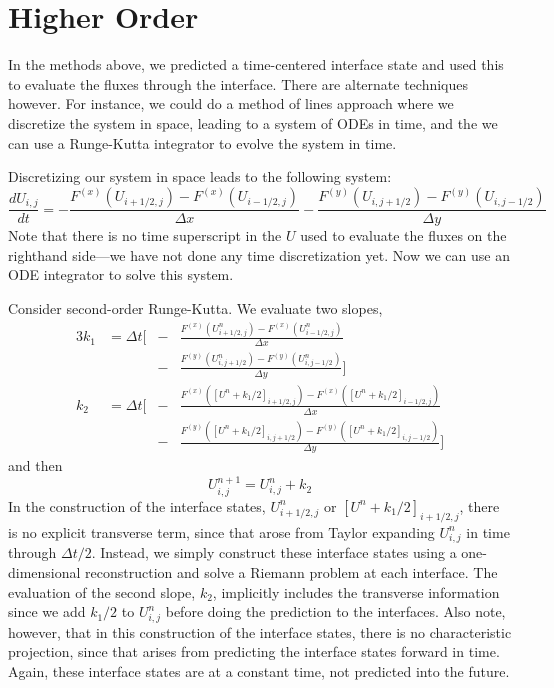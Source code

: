 \section{Higher Order}

In the methods above, we predicted a time-centered interface state and
used this to evaluate the fluxes through the interface.  There are
alternate techniques however.  For instance, we could do a method of
lines approach where we discretize the system in space, leading to a
system of ODEs in time, and the we can use a Runge-Kutta integrator to
evolve the system in time.

Discretizing our system in space leads to the following system:
\begin{equation}
\frac{dU_{i,j}}{dt} = -\frac{F^{(x)}(U_{i+1/2,j}) - F^{(x)}(U_{i-1/2,j})}{\Delta x}
                      -\frac{F^{(y)}(U_{i,j+1/2}) - F^{(y)}(U_{i,j-1/2})}{\Delta y}
\end{equation}
Note that there is no time superscript in the $U$ used to evaluate the
fluxes on the righthand side---we have not done any time
discretization yet.  Now we can use an ODE integrator to solve this system.

Consider
second-order Runge-Kutta.  We evaluate two slopes,
\begin{alignat}{3}
k_1 &= \Delta t \bigg [ &-&\frac{F^{(x)}(U^n_{i+1/2,j})
                               - F^{(x)}(U^n_{i-1/2,j})}{\Delta x} \nonumber \\
    &\,                 &-&\frac{F^{(y)}(U^n_{i,j+1/2})
                               - F^{(y)}(U^n_{i,j-1/2})}{\Delta y} \bigg ] \\
k_2 &= \Delta t \bigg [ &-&\frac{F^{(x)}([U^n + k_1/2]_{i+1/2,j})
                               - F^{(x)}([U^n + k_1/2]_{i-1/2,j})}{\Delta x} \nonumber \\
    &\,                 &-&\frac{F^{(y)}([U^n + k_1/2]_{i,j+1/2})
                               - F^{(y)}([U^n + k_1/2]_{i,j-1/2})}{\Delta y} \bigg ]
\end{alignat}
and then
\begin{equation}
U^{n+1}_{i,j} = U^n_{i,j} + k_2
\end{equation}
In the construction of the interface states, $U^n_{i+1/2,j}$ or $[U^n
+ k_1/2]_{i+1/2,j}$, there is no explicit transverse term, since that
arose from Taylor expanding $U^n_{i,j}$ in time through $\Delta t/2$.
Instead, we simply construct these interface states using a
one-dimensional reconstruction and solve a Riemann problem at each
interface.  The evaluation of the second slope, $k_2$, implicitly
includes the transverse information since we add $k_1/2$ to
$U^n_{i,j}$ before doing the prediction to the interfaces.  Also note,
however, that in this construction of the interface states, there is
no characteristic projection, since that arises from predicting the
interface states forward in time.  Again, these interface states are
at a constant time, not predicted into the future.

